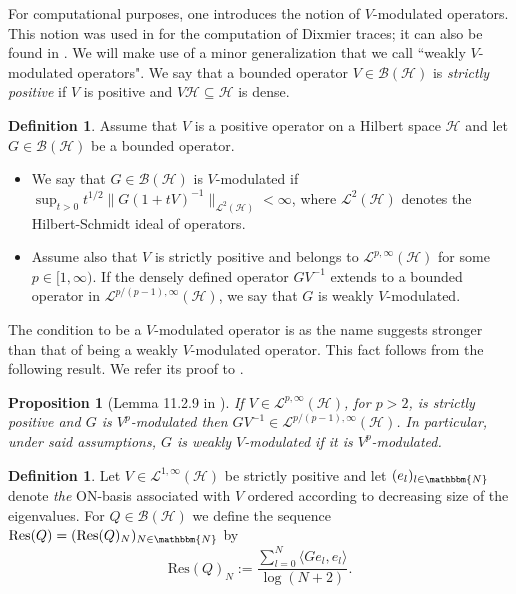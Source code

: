 \documentclass[10pt]{amsart}
\newtheorem{prop}[thm]{Proposition}
\theoremstyle{remark}
\theoremstyle{definition}
\newtheorem{deef}[thm]{Definition}
\begin{document}
For computational purposes, one introduces the notion of $V$-modulated operators. This notion was used in \cite{kaloposu} for the computation of Dixmier traces; it can also be found in \cite[Definition 11.2.1]{sukolord}. We will make use of a minor generalization that we call ``weakly $V$-modulated operators". We say that a bounded operator $V\in {\mathcal{B}}({\mathcal{H}})$ is \emph{strictly positive} if $V$ is positive and $V\mathcal{H}\subseteq {\mathcal{H}}$ is dense.

\begin{deef}
\label{defsofmod}
Assume that $V$ is a positive operator on a Hilbert space ${\mathcal{H}}$ and let $G\in {\mathcal{B}}({\mathcal{H}})$ be a bounded operator.
\begin{itemize}
\item We say that $G\in {\mathcal{B}}({\mathcal{H}})$ is $V$-modulated if $\sup_{t>0} t^{1/2}\|G(1+tV)^{-1}\|_{\mathcal{L}^2({\mathcal{H}})}<\infty$, where $\mathcal{L}^2({\mathcal{H}})$ denotes the Hilbert-Schmidt ideal of operators. 
\item Assume also that $V$ is strictly positive and belongs to $\mathcal{L}^{p,\infty}({\mathcal{H}})$ for some $p\in [1,\infty)$. If the densely defined operator $GV^{-1}$ extends to a bounded operator in $\mathcal{L}^{p/(p-1),\infty}({\mathcal{H}})$, we say that $G$ is weakly $V$-modulated.
\end{itemize}
\end{deef}

The condition to be a $V$-modulated operator is as the name suggests stronger than that of being a weakly $V$-modulated operator. This fact follows from the following result. We refer its proof to \cite{sukolord}. 

\begin{prop}[Lemma 11.2.9 in \cite{sukolord}] 
If $V\in \mathcal{L}^{p,\infty}({\mathcal{H}})$, for $p>2$, is strictly positive and $G$ is $V^p$-modulated then $GV^{-1}\in \mathcal{L}^{p/(p-1),\infty}({\mathcal{H}})$. In particular, under said assumptions, $G$ is weakly $V$-modulated if it is $V^p$-modulated.
\end{prop}

\begin{deef}
Let $V\in \mathcal{L}^{1,\infty}({\mathcal{H}})$ be strictly positive and let $(e_l)_{l\in {\mathbbm{N}}}$ denote \emph{the} ON-basis associated with $V$ ordered according to decreasing size of the eigenvalues. For $Q\in {\mathcal{B}}({\mathcal{H}})$ we define the sequence $\mathrm{Res}(Q)=(\mathrm{Res}(Q)_N)_{N\in {\mathbbm{N}}}$ by
$$\mathrm{Res}(Q)_N:=\frac{\sum_{l=0}^N\langle Ge_l,e_l\rangle}{\log(N+2)}.$$
\end{deef}
\end{document}
